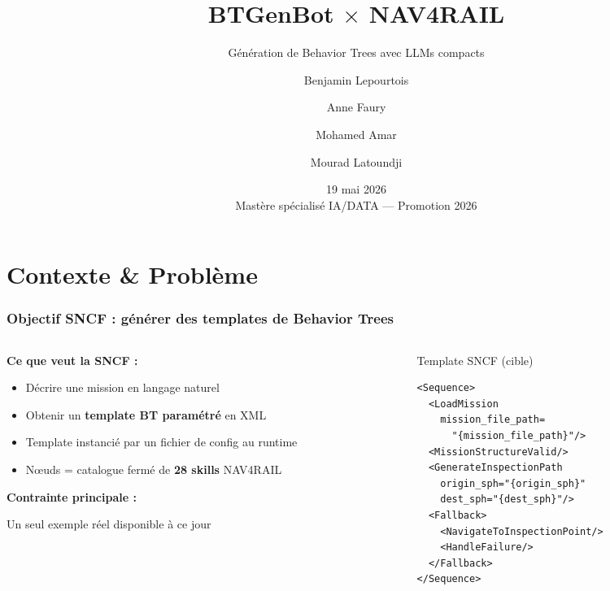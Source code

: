 \documentclass[aspectratio=169]{beamer}
\title{BTGenBot $\times$ NAV4RAIL}
\subtitle{Génération de Behavior Trees avec LLMs compacts}
\author{Benjamin Lepourtois \and Anne Faury \and Mohamed Amar \and Mourad Latoundji}
\institute{Télécom Paris}
\date[19 mai 2026]{19 mai 2026 \\ {\small Mastère spécialisé IA/DATA — Promotion 2026}}
\begin{document}
\maketitle

\section{Contexte \& Problème}

\begin{frame}[fragile]
  \frametitle{Objectif SNCF : générer des templates de Behavior Trees}

  \begin{columns}
    \begin{column}{0.55\textwidth}
      \textbf{Ce que veut la SNCF :}
      \begin{itemize}
        \item Décrire une mission en langage naturel
        \item Obtenir un \textbf{template BT paramétré} en XML
        \item Template instancié par un fichier de config au runtime
        \item Nœuds = catalogue fermé de \textbf{28 skills} NAV4RAIL
      \end{itemize}

      \vspace{0.5em}
      \textbf{Contrainte principale :}
      \begin{alertblock}{}
        \centering Un seul exemple réel disponible à ce jour
      \end{alertblock}
    \end{column}
    \begin{column}{0.42\textwidth}
      \begin{block}{Template SNCF (cible)}
        \begin{lstlisting}
<Sequence>
  <LoadMission
    mission_file_path=
      "{mission_file_path}"/>
  <MissionStructureValid/>
  <GenerateInspectionPath
    origin_sph="{origin_sph}"
    dest_sph="{dest_sph}"/>
  <Fallback>
    <NavigateToInspectionPoint/>
    <HandleFailure/>
  </Fallback>
</Sequence>
        \end{lstlisting}
      \end{block}
    \end{column}
  \end{columns}
\end{frame}
\end{document}
